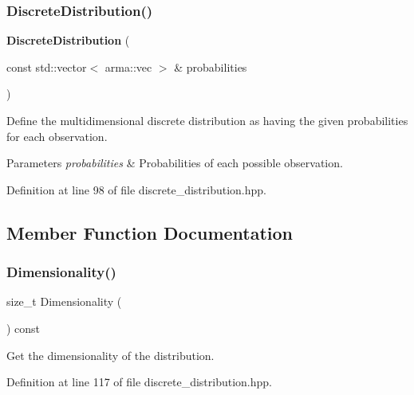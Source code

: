\subsubsection{Discrete\+Distribution()\hspace{0.1cm}{\footnotesize\ttfamily [4/4]}}
{\footnotesize\ttfamily \textbf{ Discrete\+Distribution} (\begin{DoxyParamCaption}\item[{const std\+::vector$<$ arma\+::vec $>$ \&}]{probabilities }\end{DoxyParamCaption})\hspace{0.3cm}{\ttfamily [inline]}}



Define the multidimensional discrete distribution as having the given probabilities for each observation. 


\begin{DoxyParams}{Parameters}
{\em probabilities} & Probabilities of each possible observation. \\
\hline
\end{DoxyParams}


Definition at line 98 of file discrete\+\_\+distribution.\+hpp.



\subsection{Member Function Documentation}
\mbox{\label{classmlpack_1_1distribution_1_1DiscreteDistribution_a78eda6bfb9e9462afa0fc85e32abe1af}} 
\subsubsection{Dimensionality()}
{\footnotesize\ttfamily size\+\_\+t Dimensionality (\begin{DoxyParamCaption}{ }\end{DoxyParamCaption}) const\hspace{0.3cm}{\ttfamily [inline]}}



Get the dimensionality of the distribution. 



Definition at line 117 of file discrete\+\_\+distribution.\+hpp.

